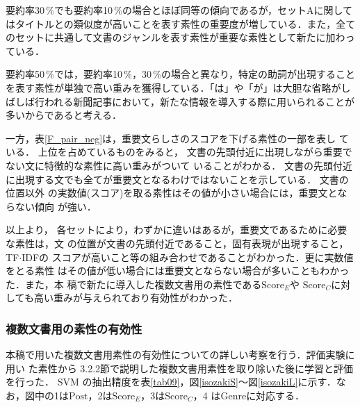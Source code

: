 要約率30\,\%でも要約率10\,\%の場合とほぼ同等の傾向であるが，セットAに関して
はタイトルとの類似度が高いことを表す素性の重要度が増している．また，全て
のセットに共通して文書のジャンルを表す素性が重要な素性として新たに加わっ
ている．

要約率50\,\%では，要約率10\,\%，30\,\%の場合と異なり，特定の助詞が出現すること
を表す素性が単独で高い重みを獲得している．「は」や「が」は大胆な省略がし
ばしば行われる新聞記事において，新たな情報を導入する際に用いられることが
多いからであると考える．

一方，表\ref{F_pair_neg}は，重要文らしさのスコアを下げる素性の一部を表し
ている．
上位を占めているものをみると，
文書の先頭付近に出現しながら重要でない文に特徴的な素性に高い重みがついて
いることがわかる．
文書の先頭付近に出現する文でも全てが重要文となるわけではないことを示している．
文書の位置以外
の実数値(スコア)を取る素性はその値が小さい場合には，重要文とならない傾向
が強い．

以上より，
各セットにより，わずかに違いはあるが，重要文であるために必要な素性は，文
の位置が文書の先頭付近であること，固有表現が出現すること，TF$\cdot$IDFの
スコアが高いこと等の組み合わせであることがわかった．更に実数値をとる素性
はその値が低い場合には重要文とならない場合が多いこともわかった．また，本
稿で新たに導入した複数文書用の素性である$\mbox{Score}_{E}$や
$\mbox{Score}_{C}$に対しても高い重みが与えられており有効性がわかった．

\subsubsection{複数文書用の素性の有効性}


本稿で用いた複数文書用素性の有効性についての詳しい考察を行う．評価実験に
用い
た素性から 3.2.2節で説明した複数文書用素性を取り除いた後に学習と評価を行った．
SVM
の抽出精度を表\ref{tab09}，図\ref{isozakiS}〜図\ref{isozakiL}に示す．な
お，図中の1は$\mbox{Post}$，2は$\mbox{Score}_{E}$，3は$\mbox{Score}_{C}$，4
は$\mbox{Genre}$に対応する．

